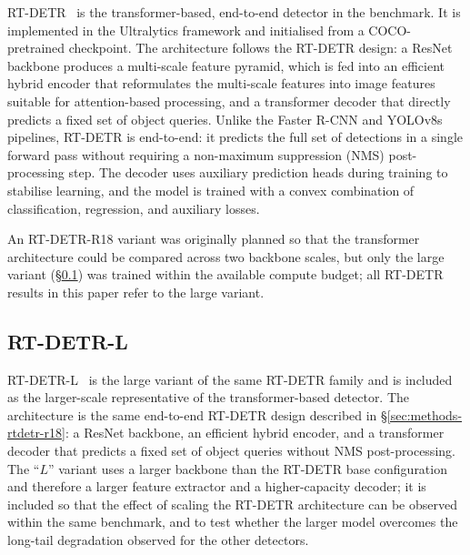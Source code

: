 \documentclass[11pt,a4paper,twocolumn]{article}
\begin{document}
RT-DETR~\cite{rtdetr2024} is the transformer-based, end-to-end detector in the benchmark.
It is implemented in the Ultralytics framework and initialised from a COCO-pretrained
checkpoint. The architecture follows the RT-DETR design: a ResNet backbone produces a
multi-scale feature pyramid, which is fed into an efficient hybrid encoder that
reformulates the multi-scale features into image features suitable for attention-based
processing, and a transformer decoder that directly predicts a fixed set of object
queries. Unlike the Faster R-CNN and YOLOv8s pipelines, RT-DETR is end-to-end: it
predicts the full set of detections in a single forward pass without requiring a
non-maximum suppression (NMS) post-processing step. The decoder uses auxiliary
prediction heads during training to stabilise learning, and the model is trained with a
convex combination of classification, regression, and auxiliary losses.

An RT-DETR-R18 variant was originally planned so that the transformer architecture
could be compared across two backbone scales, but only the large variant
(\S\ref{sec:methods-rtdetr-l}) was trained within the available compute budget;
all RT-DETR results in this paper refer to the large variant.

\subsection{RT-DETR-L}
\label{sec:methods-rtdetr-l}

RT-DETR-L~\cite{rtdetr2024} is the large variant of the same RT-DETR family and is included
as the larger-scale representative of the transformer-based detector. The architecture is
the same end-to-end RT-DETR design described in \S\ref{sec:methods-rtdetr-r18}: a ResNet backbone,
an efficient hybrid encoder, and a transformer decoder that predicts a fixed set of object
queries without NMS post-processing. The ``$L$'' variant uses a larger backbone than
the RT-DETR base configuration and therefore a larger feature extractor and a higher-capacity decoder; it is
included so that the effect of scaling the RT-DETR architecture can be observed within the
same benchmark, and to test whether the larger model overcomes the long-tail degradation
observed for the other detectors.
\end{document}
